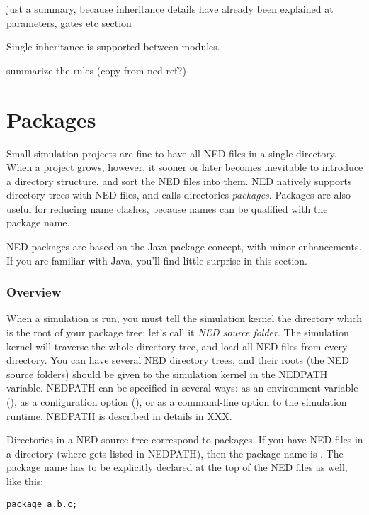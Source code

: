 just a summary, because inheritance details have already been explained
at parameters, gates etc section

Single inheritance is supported between modules.

summarize the rules (copy from ned ref?)



\section{Packages}

Small simulation projects are fine to have all NED files in a single
directory. When a project grows, however, it sooner or later becomes
inevitable to introduce a directory structure, and sort the NED files into
them. NED natively supports directory trees with NED files, and calls
directories \textit{packages}. Packages are also useful for reducing
name clashes, because names can be qualified with the package name.

\begin{note}
    NED packages are based on the Java package concept, with minor
    enhancements. If you are familiar with Java, you'll find little
    surprise in this section.
\end{note}

\subsubsection{Overview}

When a simulation is run, you must tell the simulation kernel the
directory which is the root of your package tree; let's call it
\textit{NED source folder}. The simulation kernel will traverse
the whole directory tree, and load all NED files from every directory.
You can have several NED directory trees, and their roots (the NED source
folders) should be given to the simulation kernel in the NEDPATH
variable. NEDPATH can be specified in several ways: as an environment
variable (), as a configuration option (),
or as a command-line option to the simulation runtime. NEDPATH is
described in details in XXX.

Directories in a NED source tree correspond to packages. If you have
NED files in a  directory (where 
gets listed in NEDPATH), then the package name is .
The package name has to be explicitly declared at the top of the NED
files as well, like this:

\begin{Verbatim}
package a.b.c;
\end{Verbatim}

